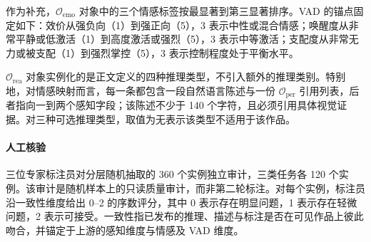 作为补充，$\mathcal{O}_{\text{emo}}$ 对象中的三个情感标签按最显著到第三显著排序。VAD 的锚点固定如下：效价从强负向（1）到强正向（5），3 表示中性或混合情感；唤醒度从非常平静或低激活（1）到高度激活或强烈（5），3 表示中等激活；支配度从非常无力或被支配（1）到强烈掌控（5），3 表示控制程度处于平衡水平。

$\mathcal{O}_{\text{rea}}$ 对象实例化的是正文定义的四种推理类型，不引入额外的推理类别。特别地，对情感映射而言，每一条都包含一段自然语言陈述与一份 $\mathcal{O}_{\text{per}}$ 引用列表，后者指向一到两个感知字段；该陈述不少于 140 个字符，且必须引用具体视觉证据。对三种可选推理类型，取值为无表示该类型不适用于该作品。

\paragraph{人工核验}
\label{app:human_verification}

三位专家标注员对分层随机抽取的 360 个实例独立审计，三类任务各 120 个实例。该审计是随机样本上的只读质量审计，而非第二轮标注。对每个实例，标注员沿一致性维度给出 0--2 的序数评分，其中 0 表示存在明显问题，1 表示存在轻微问题，2 表示可接受。一致性指已发布的推理、描述与标注是否在可见作品上彼此吻合，并锚定于上游的感知维度与情感及 VAD 维度。
